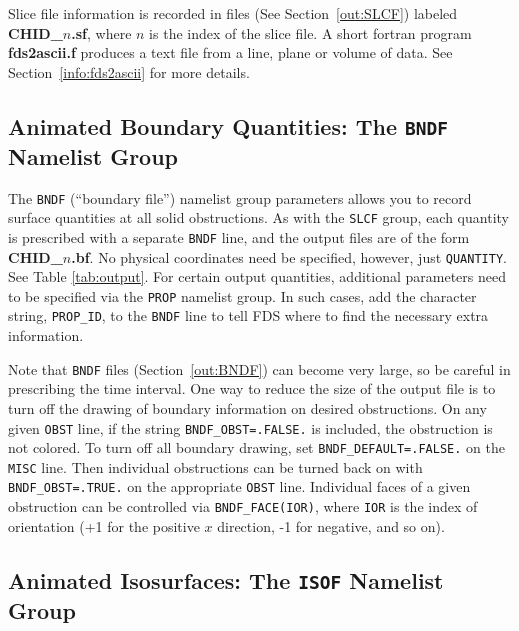 \documentclass[11pt]{book}
\newcommand{\ct}{\tt\small}
\begin{document}
Slice file information is recorded in files (See Section~\ref{out:SLCF}) 
labeled {\bf CHID\_$n$.sf}, where $n$ is the index of the slice file.
A short fortran program {\bf fds2ascii.f} produces a text file from a line,
plane or volume of data. See Section~\ref{info:fds2ascii} for more details.






\subsection{Animated Boundary Quantities: The \texorpdfstring{{\tt BNDF}}{BNDF} Namelist Group}
\label{info:BNDF}

The {\ct BNDF} (``boundary file'') 
 namelist group parameters allows you
to record surface quantities at all solid obstructions. As with
the {\ct SLCF} group, each quantity is prescribed with a separate
{\ct BNDF} line, and the output files are of the form {\bf CHID\_$n$.bf}.
No physical coordinates need be specified, however, just {\ct QUANTITY}.
See Table \ref{tab:output}. For certain output quantities, additional parameters need to be specified via
the {\ct PROP} namelist group. In such cases, add the character string, {\ct PROP\_ID}, to the {\ct BNDF} line
to tell FDS where to find the necessary extra information.

Note that {\ct BNDF} files (Section~\ref{out:BNDF}) can become very
large, so be careful in prescribing the time interval.
One way to reduce the size of the output file is to turn off the
drawing of boundary information on desired obstructions. On any given
{\ct OBST} line, if the string {\ct BNDF\_OBST=.FALSE.} is included,
the obstruction is not colored. To turn off all boundary drawing,
set {\ct BNDF\_DEFAULT=.FALSE.} on the {\ct MISC} line. Then individual
obstructions can be turned back on with {\ct BNDF\_OBST=.TRUE.} on
the appropriate {\ct OBST} line. Individual faces of a given obstruction can be controlled
via {\ct BNDF\_FACE(IOR)}, where {\ct IOR} is the index of orientation (+1 for the positive $x$ direction, -1 for negative, and so on).



\subsection{Animated Isosurfaces: The \texorpdfstring{{\tt ISOF}}{ISOF} Namelist Group}
\label{info:ISOF} 
\end{document}
